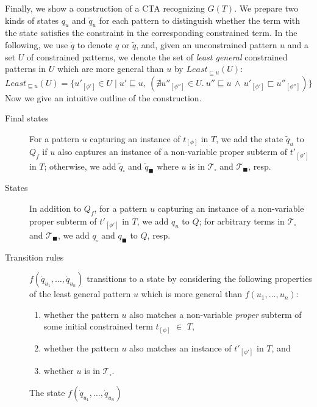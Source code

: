 \documentclass[copyright,creativecommons]{eptcs}
\newcommand{\Terms}{{\mathcal{T}}}
\newcommand{\TwC}[2]{{#1}_{[#2]}}
\newcommand{\Maximal}[1][]{{\mathit{Least}_{\sqsubseteq #1}}}
\begin{document}
Finally, we show a construction of a CTA recognizing $G(T)$.
We prepare two kinds of states $q_u$ and $\tilde{q}_u$
for each pattern to distinguish whether the term with the state
satisfies the constraint in the corresponding constrained term.
In the following, we use $\dot{q}$ to denote $q$ or $\tilde{q}$, and,
given an unconstrained pattern $u$ and a set $U$ of constrained
patterns, we denote the set of \emph{least general} constrained patterns
in $U$ which are more general than $u$ by $\Maximal[u](U)$:
\[
 \Maximal[u](U) = \{ \TwC{u'}{\phi'} \in U \mid 
 u' \sqsubseteq u,
 ~
 (\nexists \TwC{u''}{\phi''} \in U.\ 
 u'' \sqsubseteq u \,\wedge\,
 \TwC{u'}{\phi'} \sqsubset \TwC{u''}{\phi''}) \}
\]
Now we give an intuitive outline of the construction.
\begin{description}
 \item[Final states]
	    For a pattern $u$ capturing an instance of $\TwC{t}{\phi}$
	    in $T$,
	    we add the state $\tilde{q}_u$ to $Q_f$ if $u$ also captures
	    an instance of a non-variable proper subterm of
	    $\TwC{t'}{\phi'}$ in $T$;
	    otherwise, we add $\tilde{q}_\square$ and
	    $\tilde{q}_\blacksquare$ where $u$ is in
	    $\Terms_\square$ and
	    $\Terms_\blacksquare$, resp.
 \item[States]
	    In addition to $Q_f$, for a pattern $u$ capturing an
	    instance of a non-variable proper subterm of
	    $\TwC{t'}{\phi'}$ in $T$, we add $q_u$ to $Q$;
	    for arbitrary terms in $\Terms_\square$ and
	    $\Terms_\blacksquare$, we add $q_\square$ and
	    $q_\blacksquare$ to $Q$, resp.
 \item[Transition rules]
	    $f(\dot{q}_{u_1},\ldots,\dot{q}_{u_n})$ transitions to 
	    a state by considering the following properties of the least
	    general pattern $u$ which is more general than
	    $f(u_1,\ldots,u_n)$: 
	    \begin{enumerate}
	     \renewcommand{\labelenumi}{(\alph{enumi})}
	     \renewcommand{\theenumi}{(\alph{enumi})}
	     \item\label{condition-1}
		  whether the pattern $u$ also matches a non-variable
		  \emph{proper} subterm of some initial constrained term 
		  $\TwC{t}{\phi}$ $\in$ $T$,
	     \item\label{condition-2}
		  whether the pattern $u$ also matches an instance of
		  $\TwC{t'}{\phi'}$ in $T$, and
	     \item\label{condition-3} 
		  whether $u$ is in $\Terms_\square$. 
	    \end{enumerate}
	    The state $f(\dot{q}_{u_1},\ldots,\dot{q}_{u_n})$

\end{description}
\end{document}
